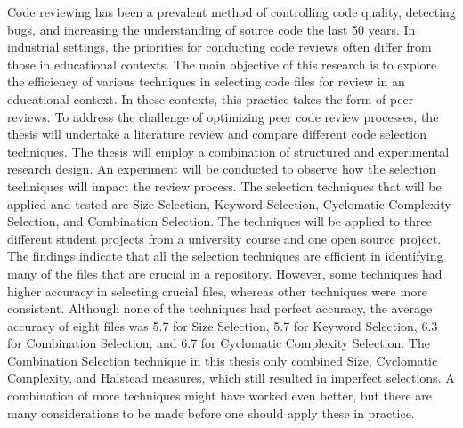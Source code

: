 Code reviewing has been a prevalent method of controlling code quality, detecting bugs, and increasing the understanding of source code the last 50 years. In industrial settings, the priorities for conducting code reviews often differ from those in educational contexts. The main objective of this research is to explore the efficiency of various techniques in selecting code files for review in an educational context. In these contexts, this practice takes the form of peer reviews. To address the challenge of optimizing peer code review processes, the thesis will undertake a literature review and compare different code selection techniques. The thesis will employ a combination of structured and experimental research design. An experiment will be conducted to observe how the selection techniques will impact the review process. The selection techniques that will be applied and tested are Size Selection, Keyword Selection, Cyclomatic Complexity Selection, and Combination Selection. The techniques will be applied to three different student projects from a university course and one open source project. \\ 

The findings indicate that all the selection techniques are efficient in identifying many of the files that are crucial in a repository. However, some techniques had higher accuracy in selecting crucial files, whereas other techniques were more consistent. Although none of the techniques had perfect accuracy, the average accuracy of eight files was 5.7 for Size Selection, 5.7 for Keyword Selection, 6.3 for Combination Selection, and 6.7 for Cyclomatic Complexity Selection. The Combination Selection technique in this thesis only combined Size, Cyclomatic Complexity, and Halstead measures, which still resulted in imperfect selections. A combination of more techniques might have worked even better, but there are many considerations to be made before one should apply these in practice. 



